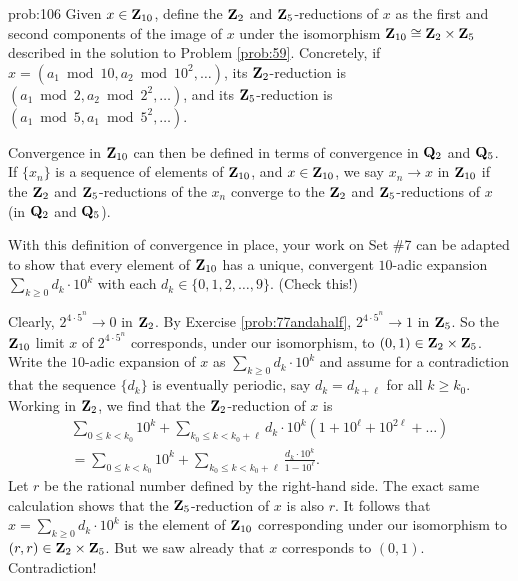 \begin{sol}{prob:106}  Given $x\in \mathbf{Z}_{10}$, define the \textsf{$\mathbf{Z}_2$ and $\mathbf{Z}_5$-reductions of $x$} as the first and second components of the image of $x$ under the isomorphism $\mathbf{Z}_{10}\cong \mathbf{Z}_2 \times \mathbf{Z}_5$ described in the solution to Problem \ref{prob:59}. Concretely, if $x=(a_1\bmod{10}, a_2\bmod{10^2}, \dots)$, its $\mathbf{Z}_2$-reduction is $(a_1\bmod{2}, a_2\bmod{2^2}, \dots)$, and its $\mathbf{Z}_5$-reduction is $(a_1\bmod{5}, a_1\bmod{5^2},\dots)$.

Convergence in $\mathbf{Z}_{10}$ can then be defined in terms of convergence in $\mathbf{Q}_2$ and $\mathbf{Q}_5$.  If $\{x_n\}$ is a sequence of elements of $\mathbf{Z}_{10}$, and $x \in \mathbf{Z}_{10}$, we say $x_n\to x$ in $\mathbf{Z}_{10}$ if the $\mathbf{Z}_2$ and $\mathbf{Z}_5$-reductions of the $x_n$ converge to the $\mathbf{Z}_2$ and $\mathbf{Z}_5$-reductions of $x$ (in $\mathbf{Q}_2$ and $\mathbf{Q}_5$).

With this definition of convergence in place, your work on Set \#7 can be adapted to show that every element of $\mathbf{Z}_{10}$ has a unique, convergent $10$-adic expansion $\sum_{k\ge 0} d_k\cdot 10^k$ with each $d_k \in \{0,1,2,\dots,9\}$. (Check this!)

Clearly, $2^{4\cdot 5^n} \to 0$ in $\mathbf{Z}_2$. By Exercise \ref{prob:77andahalf}, $2^{4\cdot 5^n}\to 1$ in $\mathbf{Z}_5$. So the $\mathbf{Z}_{10}$ limit $x$ of $2^{4\cdot 5^n}$ corresponds, under our isomorphism, to $(0,1) \in \mathbf{Z}_2 \times \mathbf{Z}_5$. Write the $10$-adic expansion of $x$ as $\sum_{k\ge 0} d_k \cdot 10^k$ and assume for a contradiction that the sequence $\{d_k\}$ is eventually periodic, say $d_k = d_{k+\ell}$ for all $k\ge k_0$. Working in $\mathbf{Z}_2$, we find that the $\mathbf{Z}_2$-reduction of $x$ is
\begin{multline*} \sum_{0 \le k < k_0} 10^k + \sum_{k_0 \le k < k_0+\ell} d_k \cdot 10^k (1 + 10^{\ell} + 10^{2\ell} + \dots) \\= \sum_{0 \le k < k_0} 10^k + \sum_{k_0 \le k < k_0+\ell} \frac{d_k \cdot 10^k}{1-10^{\ell}}.\end{multline*}
Let $r$ be the rational number defined by the right-hand side. The exact same calculation shows that the $\mathbf{Z}_5$-reduction of $x$ is also $r$. It follows that $x=\sum_{k \ge 0} d_k\cdot 10^k$ is the element of $\mathbf{Z}_{10}$ corresponding under our isomorphism to $(r,r) \in \mathbf{Z}_2\times \mathbf{Z}_5$. But we saw already that $x$ corresponds to $(0,1)$. Contradiction! 
\end{sol}

